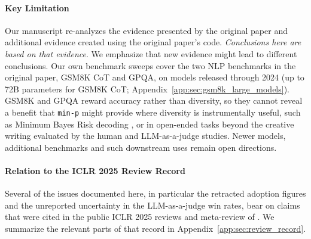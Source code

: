 \paragraph{Key Limitation} Our manuscript re-analyzes the evidence presented by the original paper \citep{nguyen2024minp} and additional evidence created using the original paper's code. \textit{Conclusions here are based on that evidence}. We emphasize that new evidence might lead to different conclusions.
Our own benchmark sweeps cover the two NLP benchmarks in the original paper, GSM8K CoT and GPQA, on models released through 2024 (up to 72B parameters for GSM8K CoT; Appendix~\ref{app:sec:gsm8k_large_models}).
GSM8K and GPQA reward accuracy rather than diversity, so they cannot reveal a benefit that \texttt{min-p} might provide where diversity is instrumentally useful, such as Minimum Bayes Risk decoding \citep{freitag2023epsilon}, or in open-ended tasks beyond the creative writing evaluated by the human and LLM-as-a-judge studies. Newer models, additional benchmarks and such downstream uses remain open directions.


\paragraph{Relation to the ICLR 2025 Review Record} Several of the issues documented here, in particular the retracted adoption figures and the unreported uncertainty in the LLM-as-a-judge win rates, bear on claims that were cited in the public ICLR 2025 reviews and meta-review of \citet{nguyen2024minp}. We summarize the relevant parts of that record in Appendix~\ref{app:sec:review_record}.


